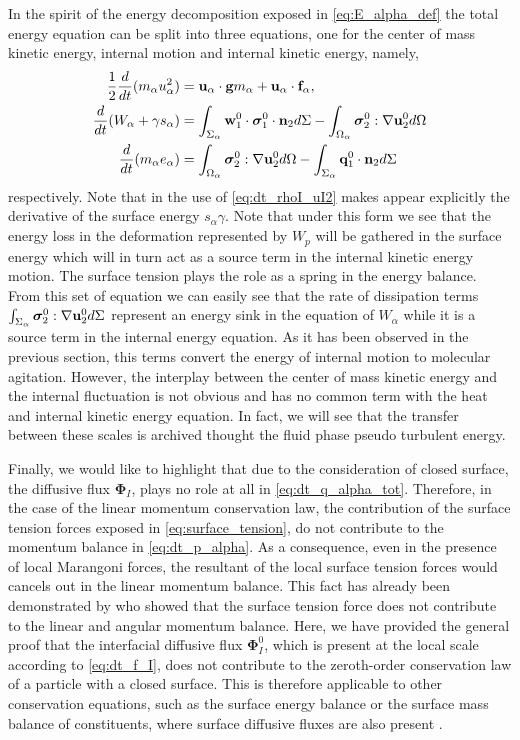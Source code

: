 In the spirit of the energy decomposition exposed in \ref{eq:E_alpha_def} the total energy equation can be split into three equations, one for the center of mass kinetic energy, internal motion and internal kinetic energy, namely,  
\begin{align}
    \label{eq:dt_u2_alpha}
    \frac{1}{2}\frac{d}{d t} (m_\alpha u_\alpha^2)
    &= 
    \textbf{u}_\alpha\cdot
    \textbf{g}m_\alpha
    + 
    \textbf{u}_\alpha\cdot
    \textbf{f}_\alpha,\\
    \label{eq:dt_w2_alpha}
    \frac{d}{d t} (W_\alpha + \gamma s_\alpha)
    &= 
    \int_{\Sigma_\alpha} \textbf{w}_1^0 \cdot \bm{\sigma}_1^0 \cdot \textbf{n}_2  d\Sigma
    - \int_{\Omega_\alpha}  \bm{\sigma}_2^0 : \mathbf{\nabla}\textbf{u}_2^0  d\Omega
    \\
     \label{eq:dt_e_alpha}
    \frac{d}{d t} (m_\alpha e_\alpha )
    &= 
     \int_{\Omega_\alpha}  \bm{\sigma}_2^0 : \mathbf{\nabla}\textbf{u}_2^0   d\Omega
    -  \int_{\Sigma_\alpha} \textbf{q}_1^0\cdot \textbf{n}_2  d\Sigma 
\end{align}
respectively. 
Note that in \citet{eq:dt_w2_alpha} the use of \ref{eq:dt_rhoI_uI2} makes appear explicitly the derivative of the surface energy $s_\alpha \gamma$. 
Note that under this form we see that the energy loss in the deformation represented by $W_p$ will be gathered in the surface energy which will in turn act as a source term in the internal kinetic energy motion.
The surface tension plays the role as a spring in the energy balance.   
From this set of equation we can easily see that the rate of dissipation terms $\int_{\Sigma_\alpha} \bm{\sigma}_2^0 : \mathbf{\nabla}\textbf{u}_2^0 d\Sigma$ represent an energy sink in the equation of $W_\alpha$ while it is a source term in the internal energy equation. 
As it has been observed in the previous section, this terms convert the energy of internal motion to molecular agitation. 
However, the interplay between the center of mass  kinetic energy and the internal fluctuation is not obvious and has no common term with the heat and internal kinetic energy equation.
In fact, we will see that the transfer between these scales is archived thought the fluid phase pseudo turbulent energy. 


Finally, we would like to highlight that  due to the consideration of closed surface, the diffusive flux $\mathbf{\Phi}_I$, plays no role at all in \ref{eq:dt_q_alpha_tot}.
Therefore, in the case of the linear momentum conservation law, the contribution of the surface tension forces exposed in \ref{eq:surface_tension}, do not contribute to the momentum balance in \ref{eq:dt_p_alpha}.
As a consequence, even in the presence of local Marangoni forces, the resultant of the local surface tension forces would cancels out in the linear momentum balance.
This fact has already been demonstrated by \citet{hesla1993note} who showed that the surface tension force does not contribute to the linear and angular momentum balance. 
Here, we have provided the general proof that the interfacial diffusive flux $\mathbf{\Phi}_I^0$, which is present at the local scale according to \ref{eq:dt_f_I}, does not contribute to the zeroth-order conservation law of a particle with a closed surface.
This is therefore applicable to other conservation equations, such as the surface energy balance or the surface mass balance of constituents, where surface diffusive fluxes are also present \citep{bothe2022sharp,manikantan2020surfactant}. 

